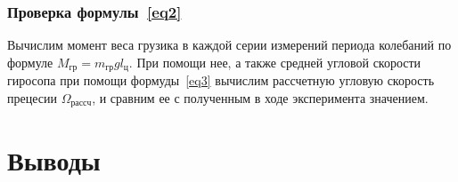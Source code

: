 \documentclass[a4paper,11pt]{article}
\begin{document}
\subsubsection{Проверка формулы~\ref{eq2}} %
Вычислим момент веса грузика в каждой серии измерений периода колебаний по формуле $M_{гр} = m_{гр}g l_{ц}$. При помощи нее, а также средней угловой скорости гиросопа при помощи формуды~\ref{eq3} вычислим рассчетную угловую скорость прецесии $\Omega_{рассч}$, и сравним ее с полученным в ходе эксперимента значением.
\section{Выводы}
\end{document}
